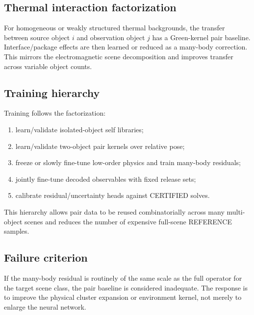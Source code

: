\subsection{Thermal interaction factorization}

For homogeneous or weakly structured thermal backgrounds, the transfer between
source object $i$ and observation object $j$ has a Green-kernel pair baseline.
Interface/package effects are then learned or reduced as a many-body correction.
This mirrors the electromagnetic scene decomposition and improves transfer
across variable object counts.

\subsection{Training hierarchy}

Training follows the factorization:
\begin{enumerate}
\item learn/validate isolated-object self libraries;
\item learn/validate two-object pair kernels over relative pose;
\item freeze or slowly fine-tune low-order physics and train many-body residuals;
\item jointly fine-tune decoded observables with fixed release sets;
\item calibrate residual/uncertainty heads against CERTIFIED solves.
\end{enumerate}

This hierarchy allows pair data to be reused combinatorially across many
multi-object scenes and reduces the number of expensive full-scene REFERENCE
samples.

\subsection{Failure criterion}

If the many-body residual is routinely of the same scale as the full operator
for the target scene class, the pair baseline is considered inadequate. The
response is to improve the physical cluster expansion or environment kernel,
not merely to enlarge the neural network.
